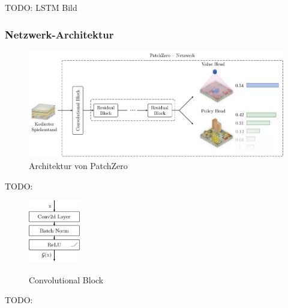 TODO: LSTM Bild

\pagebreak

\subsubsection*{Netzwerk-Architektur}

\cite{2018.Lc0AlphaZero}
\cite{2019.SqueezeandExcitation}
\cite{2020.Lc0NetworkTopology}

\begin{figure}[!ht]
    \centering
    \includegraphics[width=\textwidth]{res/pictures/patch-zero-architecture.pdf}
    \caption{Architektur von PatchZero}
    \label{fig:patch-zero-architecture}
\end{figure}

TODO:

\begin{figure}
    \includegraphics[width=0.2\textwidth]{res/pictures/conv-block.pdf}
    \centering
    \caption[Convolutional Block]{\unskip}
    Convolutional Block
    \label{fig:conv-block}
\end{figure}

TODO:

